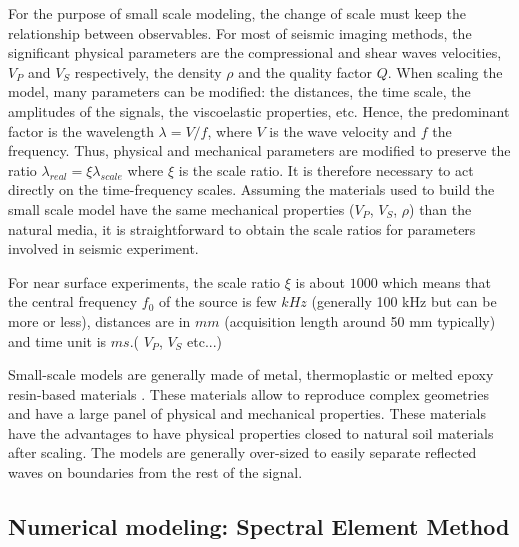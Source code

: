 \documentclass[manuscript,revised]{geophysics}
\begin{document}
\noindent For the purpose of small scale modeling, the change of scale must keep the relationship between observables. For most of seismic imaging methods, the significant physical parameters are the compressional and shear waves velocities, $V_{P}$ and $V_{S}$ respectively, the density $\rho$ and the quality factor $Q$. When scaling the model, many parameters can be modified: the distances, the time scale, the amplitudes of the signals, the viscoelastic properties, etc. Hence, the predominant factor is the wavelength $\lambda = V / f$, where $V$ is the wave velocity and $f$ the frequency. Thus, physical and mechanical parameters are modified to preserve the ratio $\lambda_{real} = \xi \lambda_{scale}$ where $\xi$ is the scale ratio. It is therefore necessary to act directly on the time-frequency scales. Assuming the materials used to build the small scale model have the same mechanical properties ($V_{P}$, $V_{S}$, $\rho$) than the natural media, it is straightforward to obtain the scale ratios for parameters involved in seismic experiment.

\noindent For near surface experiments, the scale ratio $\xi$ is about $1000$ which means that the central frequency $f_{0}$ of the source is few $kHz$ (generally 100 kHz but can be more or less), distances are in $mm$ (acquisition length around 50 mm typically) and time unit is $ms$.( $V_{P}$, $V_{S}$ etc...)

\noindent Small-scale models are generally made of metal, thermoplastic or melted epoxy resin-based materials \citep{Bretaudeau_FWI_2013,Bretaudeau_SSM_2011,Bretaudeau_SSA_2008b}. These materials allow to reproduce complex geometries and have a large panel of physical and mechanical properties. These materials have the advantages to have physical properties closed to natural soil materials after scaling. The models are generally over-sized to easily separate reflected waves on boundaries from the rest of the signal. 

\subsection{Numerical modeling: Spectral Element Method}
\end{document}
